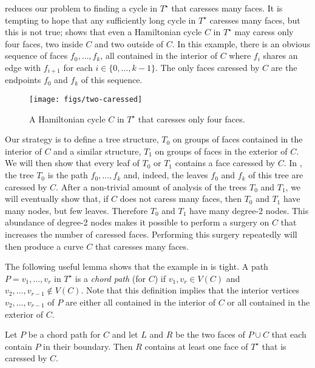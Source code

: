 \documentclass{patmorin}
\newcommand{\dual}[1]{{#1}^\star}
\begin{document}
 reduces our problem to finding a cycle in
$\dual{T}$ that caresses many faces.  It is tempting to hope that
any sufficiently long cycle in $\dual{T}$ caresses many faces, but
this is not true;  shows that even a Hamiltonian
cycle $C$ in $\dual{T}$ may caress only four faces, two inside $C$ and
two outside of $C$.  In this example, there is an obvious sequence of
faces $f_0,\ldots,f_k$, all contained in the interior of $C$ where $f_i$
shares an edge with $f_{i+1}$ for each $i\in\{0,\ldots,k-1\}$.  The only
faces caressed by $C$ are the endpoints $f_0$ and $f_k$ of this sequence.

\begin{figure}
   \begin{center}
       \texttt{[image: figs/two-caressed]}
   \end{center}
   \caption{A Hamiltonian cycle $C$ in $\dual{T}$ that caresses only four faces.}
\end{figure}

Our strategy is to define a tree structure, $T_0$ on groups of faces
contained in the interior of $C$ and a similar structure, $T_1$ on groups
of faces in the exterior of $C$.  We will then show that every leaf of
$T_0$ or $T_1$ contains a face caressed by $C$. In ,
the tree $T_0$ is the path $f_0,\ldots,f_k$ and, indeed, the leaves $f_0$
and $f_k$ of this tree are caressed by $C$.  After a non-trivial amount
of analysis of the trees $T_0$ and $T_1$, we will eventually show that,
if $C$ does not caress many faces, then $T_0$ and $T_1$ have many nodes,
but few leaves.  Therefore $T_0$ and $T_1$ have many degree-2 nodes.
This abundance of degree-2 nodes makes it possible to perform a surgery
on $C$ that increases the number of caressed faces.  Performing this
surgery repeatedly will then produce a curve $C$ that caresses many faces.

The following useful lemma shows that the example in 
is tight.  A path $P=v_1,\ldots,v_r$ in $\dual{T}$ is a \emph{chord
path} (for $C$) if $v_1,v_r\in V(C)$ and $v_2,\ldots,v_{r-1}\not\in
V(C)$.  Note that this definition implies that the interior vertices
$v_2,\ldots,v_{r-1}$ of $P$ are either all contained in the interior of
$C$ or all contained in the exterior of $C$.

\begin{lem}
   Let $P$ be a chord path for $C$ and let $L$ and $R$ be the two faces
   of $P\cup C$ that each contain $P$ in their boundary. Then $R$
   contains at least one face of $\dual{T}$ that is caressed by $C$.
\end{lem}
\end{document}

